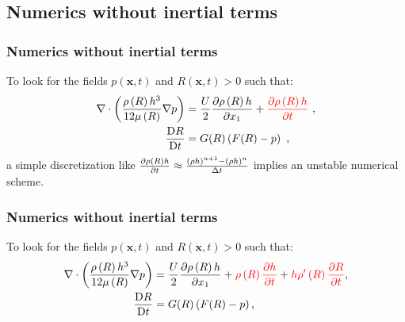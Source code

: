 \documentclass[10pt,aspectratio=169]{beamer}
\begin{document}
\subsection{Numerics without inertial terms}
\setcounter{showSlideNumbers}{0}
\begin{frame}[noframenumbering]
\tableofcontents[
currentsection,
currentsubsection,
subsectionstyle=show/shaded/hide
]
\end{frame}
\setcounter{showSlideNumbers}{1}


\begin{frame}\frametitle{Numerics without inertial terms}
To look for the fields $p(\mathbf{x},t)$ and $R(\mathbf{x},t)>0$ such that:
\begin{align*}
\nabla\cdot\left(\frac{\rho\left(R\right) h^3}{12\mu\left(R\right) }\nabla p \right)&=\frac{U}{2}\frac{\partial \rho\left(R\right) h}{\partial x_1}+{\color{red}\frac{\partial \rho\left(R\right) h}{\partial t}}~,\\
\frac{\mbox{D} R}{\mbox{D} t}&=G(R)\left(F(R)-p\right)~,
\end{align*}
a simple discretization like $\frac{\partial \rho\left(R\right) h}{\partial t}\approx \frac{(\rho h)^{n+1}-(\rho h)^{n}}{\Delta t}$ implies an unstable numerical scheme.
\end{frame}


\begin{frame}[noframenumbering]\frametitle{Numerics without inertial terms}
To look for the fields $p(\mathbf{x},t)$ and $R(\mathbf{x},t)>0$ such that:
\begin{align*}
\nabla\cdot\left(\frac{\rho\left(R\right) h^3}{12\mu\left(R\right) }\nabla p \right)&=\frac{U}{2}\frac{\partial \rho\left(R\right) h}{\partial x_1}+{\color{red}\rho\left(R\right)\frac{\partial  h}{\partial t}}+{\color{red}h\rho'\left(R\right)\frac{\partial R}{\partial t}},\\
\frac{\mbox{D} R}{\mbox{D} t}&=G(R)\left(F(R)-p\right),
\end{align*}
\end{frame}

\end{document}
